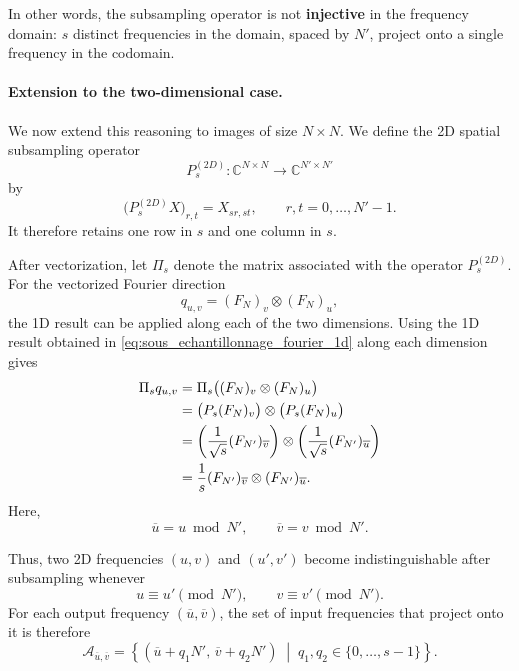 In other words, the subsampling operator is not \textbf{injective} in the frequency domain:
$s$ distinct frequencies in the domain, spaced by $N'$, project onto a single frequency in
the codomain.

\paragraph{Extension to the two-dimensional case.}

We now extend this reasoning to images of size $N \times N$. We define the 2D spatial
subsampling operator
\[
    P_s^{(2D)} : \mathbb{C}^{N \times N} \longrightarrow \mathbb{C}^{N' \times N'}
\]
by
\begin{equation}
    \big(P_s^{(2D)}X\big)_{r,t}
    =
    X_{sr,st},
    \qquad r,t = 0,\dots,N'-1.
    \label{eq:def_sous_echantillonnage_2d}
\end{equation}
It therefore retains one row in $s$ and one column in $s$.

After vectorization, let $\Pi_s$ denote the matrix associated with the operator
$P_s^{(2D)}$. For the vectorized Fourier direction
\[
    q_{u,v}
    =
    (F_N)_v \otimes (F_N)_u,
\]
the 1D result can be applied along each of the two dimensions. Using the
1D result obtained in \eqref{eq:sous_echantillonnage_fourier_1d} along each dimension gives
\begin{align}
    \Pi_s q_{u,v}
    &=
    \Pi_s\big((F_N)_v \otimes (F_N)_u\big) \notag \\
    &=
    \big(P_s(F_N)_v\big) \otimes \big(P_s(F_N)_u\big) \notag \\
    &=
    \left(\frac{1}{\sqrt{s}}(F_{N'})_{\overline{v}}\right)
    \otimes
    \left(\frac{1}{\sqrt{s}}(F_{N'})_{\overline{u}}\right) \notag \\
    &=
    \frac{1}{s}
    (F_{N'})_{\overline{v}} \otimes (F_{N'})_{\overline{u}}.
    \label{eq:sous_echantillonnage_fourier_2d}
\end{align}
Here,
\[
    \overline{u} = u \bmod N',
    \qquad
    \overline{v} = v \bmod N'.
\]

Thus, two 2D frequencies $(u,v)$ and $(u',v')$ become indistinguishable after subsampling
whenever
\[
    u \equiv u' \pmod{N'},
    \qquad
    v \equiv v' \pmod{N'}.
\]
For each output frequency $(\overline{u},\overline{v})$, the set of input frequencies
that project onto it is therefore
\begin{equation}
    \mathcal{A}_{\overline{u},\overline{v}}
    =
    \left\{
        (\overline{u}+q_1N',\,\overline{v}+q_2N')
        \;\middle|\;
        q_1,q_2 \in \{0,\dots,s-1\}
    \right\}.
    \label{eq:classe_aliasing_2d}
\end{equation}

